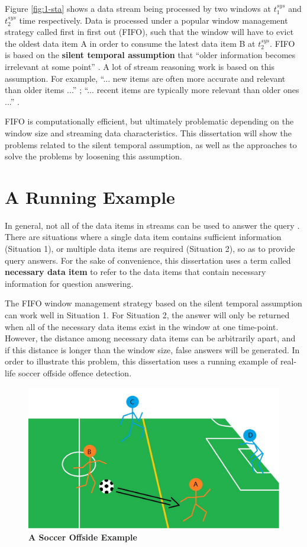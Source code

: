 Figure \ref{fig:1-sta} shows a data stream being processed by two windows at $t^{sys}_1$ and $t^{sys}_2$ time respectively. 
Data is processed under a popular window management strategy called first in first out (FIFO), such that the window will have to evict the oldest data item A in order to consume the latest data item B at $t^{sys}_{2}$.
FIFO is based on the \textbf{silent temporal assumption} that ``older information becomes irrelevant at some point'' \cite{barbieri2010stream} \cite{stuckenschmidt2010towards}.
A lot of stream reasoning work is based on this assumption.
For example, 
``... new items are often more accurate and relevant than older items ...'' \cite{golab2003processing};
``... recent items are typically more relevant than older ones ...'' \cite{barbieri2010deductive}.

FIFO is computationally efficient, but ultimately problematic depending on the window size and streaming data characteristics. 
This dissertation will show the problems related to the silent temporal assumption, as well as the approaches to solve the problems by loosening this assumption. 
%
\section{A Running Example}
In general, not all of the data items in streams can be used to answer the query \cite{mileo2013streamrule}.
There are situations where a single data item contains sufficient information (Situation 1), or multiple data items are required (Situation 2), so as to provide query answers. 
For the sake of convenience, this dissertation uses a term called \textbf{necessary data item} to refer to the data items that contain necessary information for question answering. 

The FIFO window management strategy based on the silent temporal assumption can work well in Situation 1. 
For Situation 2, the answer will only be returned when all of the necessary data items exist in the window at one time-point. 
However, the distance among necessary data items can be arbitrarily apart, and if this distance is longer than the window size, false answers will be generated. 
In order to illustrate this problem, this dissertation uses a running example of real-life soccer offside offence detection.

\begin{figure}[!htbp]
	\centering
	\includegraphics[width=5in]{img/1-soe.pdf}
	\caption{\textbf{A Soccer Offside Example}}
	\label{fig:1-soe} 
\end{figure}

